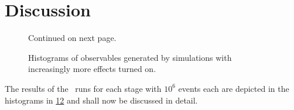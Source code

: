 \section{Discussion}%
\label{sec:disco}
\begin{figure}[ht]
  \centering
  \begin{subfigure}[t]{.49\textwidth}
    \caption{\label{fig:disc-xs}}
  \end{subfigure}
  \begin{subfigure}[t]{.49\textwidth}
    \caption{\label{fig:disc-cos_theta}}
  \end{subfigure}
  \begin{subfigure}[t]{.49\textwidth}
    \caption{\label{fig:disc-eta}}
  \end{subfigure}
  \begin{subfigure}[t]{.49\textwidth}
    \caption{\label{fig:disc-total_pT}}
  \end{subfigure}
  \begin{subfigure}[t]{.49\textwidth}
    \caption{\label{fig:disc-inv_m}}
  \end{subfigure}
  \begin{subfigure}[t]{.49\textwidth}
    \caption{\label{fig:disc-o_angle}}
  \end{subfigure}
  \caption{Continued on next page.}
\end{figure}
%
\begin{figure}[t]
  \centering \ContinuedFloat
  \begin{subfigure}[t]{.49\textwidth}
    \caption{\label{fig:disc-o_angle_cs}}
  \end{subfigure}
  \begin{subfigure}[t]{.49\textwidth}
    \caption{\label{fig:disc-pT}}
  \end{subfigure}
  \begin{subfigure}[t]{.49\textwidth}
    \caption{\label{fig:disc-pT_subl}}
  \end{subfigure}
  \begin{subfigure}[t]{.49\textwidth}
    \caption{\label{fig:disc-azimuthal_angle}}
  \end{subfigure}

  \caption{\label{fig:holhistos} Histograms of observables generated
    by simulations with increasingly more effects turned on.}
\end{figure}
%
The results of the \sherpa\ runs for each stage with \(10^6\) events
each are depicted in the histograms in \cref{fig:holhistos} and shall
now be discussed in detail.

